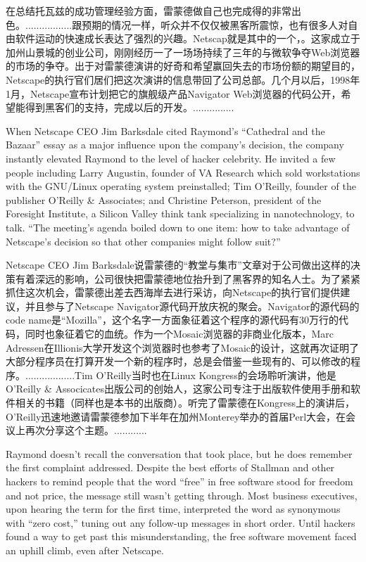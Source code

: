 \ifdefined\chs
在总结托瓦兹的成功管理经验方面，雷蒙德做自己也完成得的非常出色。.................跟预期的情况一样，听众并不仅仅被黑客所震惊，也有很多人对自由软件运动的快速成长表达了强烈的兴趣。Netscap就是其中的一个，。这家成立于加州山景城的创业公司，刚刚经历一了一场场持续了三年的与微软争夺Web浏览器的市场的争夺。出于对雷蒙德演讲的好奇和希望赢回失去的市场份额的期望目的，Netscape的执行官们居们把这次演讲的信息带回了公司总部。几个月以后，1998年1月，Netscape宣布计划把它的旗舰级产品Navigator Web浏览器的代码公开，希望能得到黑客们的支持，完成以后的开发。...............
\fi

\ifdefined\eng
When Netscape CEO Jim Barksdale cited Raymond's ``Cathedral and the Bazaar'' essay as a major influence upon the company's decision, the company instantly elevated Raymond to the level of hacker celebrity. He invited a few people including Larry Augustin, founder of VA Research which sold workstations with the GNU/Linux operating system preinstalled; Tim O'Reilly,  founder of the publisher O'Reilly \& Associates; and Christine Peterson, president of the Foresight Institute, a Silicon Valley think tank specializing in nanotechnology, to talk. ``The meeting's agenda boiled down to one item: how to take advantage of Netscape's decision so that other companies might follow suit?''
\fi

\ifdefined\chs
Netscape CEO Jim Barksdale说雷蒙德的“教堂与集市”文章对于公司做出这样的决策有着深远的影响，公司很快把雷蒙德地位抬升到了黑客界的知名人士。为了紧紧抓住这次机会，雷蒙德出差去西海岸去进行采访，向Netscape的执行官们提供建议，并且参与了Netscape Navigator源代码开放庆祝的聚会。Navigator的源代码的code name是“Mozilla”，这个名字一方面象征着这个程序的源代码有30万行的代码，同时也象征着它的血统。作为一个Mosaic浏览器的非商业化版本，Marc Adressen在Illionis大学开发这个浏览器时也参考了Mosaic的设计，这就再次证明了大部分程序员在打算开发一个新的程序时，总是会借鉴一些现有的、可以修改的程序。..................Tim O'Reilly当时也在Linux Kongress的会场聆听演讲，他是O'Reilly & Associcates出版公司的创始人，这家公司专注于出版软件使用手册和软件相关的书籍（同样也是本书的出版商）。听完了雷蒙德在Kongress上的演讲后，O'Reilly迅速地邀请雷蒙德参加下半年在加州Monterey举办的首届Perl大会，在会议上再次分享这个主题。............
\fi

\ifdefined\eng
Raymond doesn't recall the conversation that took place, but he does remember the first complaint addressed. Despite the best efforts of Stallman and other hackers to remind people that the word ``free'' in free software stood for freedom and not price, the message still wasn't getting through. Most business executives, upon hearing the term for the first time, interpreted the word as synonymous with ``zero cost,'' tuning out any follow-up messages in short order. Until hackers found a way to get past this misunderstanding, the free software movement faced an uphill climb, even after Netscape.
\fi

